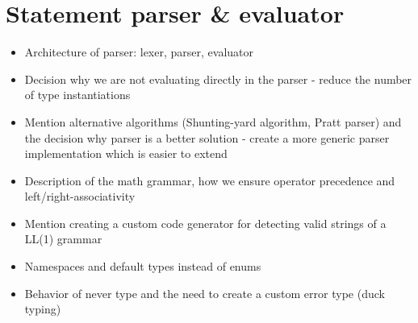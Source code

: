 \section{Statement parser \& evaluator}

\begin{itemize}
  \item Architecture of parser: lexer, parser, evaluator
  \item Decision why we are not evaluating directly in the parser - reduce the number of type instantiations
  \item Mention alternative algorithms (Shunting-yard algorithm, Pratt parser) and the decision why parser is a better solution - create a more generic parser implementation which is easier to extend
  \item Description of the math grammar, how we ensure operator precedence and left/right-associativity
  \item Mention creating a custom code generator for detecting valid strings of a LL(1) grammar
  \item Namespaces and default types instead of enums
  \item Behavior of never type and the need to create a custom error type (duck typing)
\end{itemize}